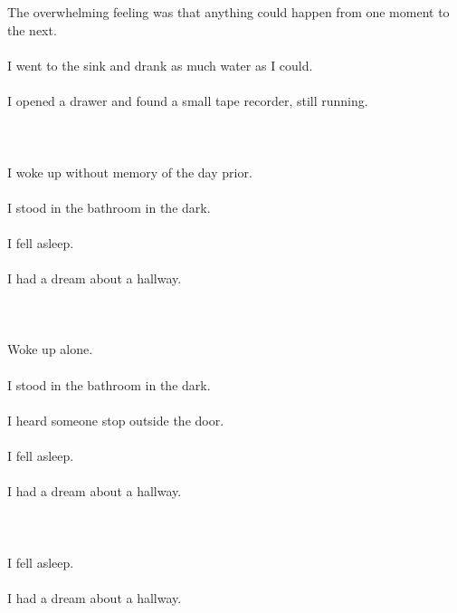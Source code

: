 \documentclass{article}
\begin{document}
    \section{}
    The overwhelming feeling was that anything could happen from one moment to the next.\\\\I went to the sink and drank as much water as I could.\\\\I opened a drawer and found a small tape recorder, still running.\\\\ 
    \newpage
    
    \section{}
    I woke up without memory of the day prior.\\\\I stood in the bathroom in the dark.\\\\I fell asleep.\\\\I had a dream about a hallway.\\\\ 
    \newpage
    
    \section{}
    Woke up alone.\\\\I stood in the bathroom in the dark.\\\\I heard someone stop outside the door.\\\\I fell asleep.\\\\I had a dream about a hallway.\\\\ 
    \newpage
    
    \section{}
    I fell asleep.\\\\I had a dream about a hallway.\\\\ 
    \newpage
    
\end{document}
